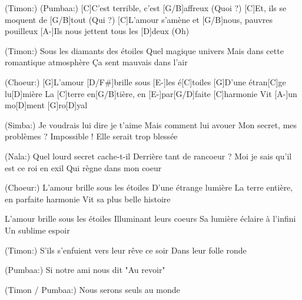
\begin{guitar}
	 (Timon:) (Pumbaa:)
[C]C'est terrible, c'est [G/B]affreux (Quoi ?)
[C]Et, ils se moquent de [G/B]tout (Qui ?)
[C]L'amour s'amène et [G/B]nous, pauvres pouilleux
[A-]Ils nous jettent tous les [D]deux (Oh)


(Timon:)
Sous les diamants des étoiles
Quel magique univers
Mais dans cette romantique atmosphère
Ça sent mauvais dans l'air

(Choeur:)
[G]L'amour [D/F#]brille sous [E-]les é[C]toiles
[G]D'une étran[C]ge lu[D]mière
La [C]terre en[G/B]tière, en [E-]par[G/D]faite [C]harmonie
Vit [A-]un mo[D]ment [G]ro[D]yal

(Simba:)
Je voudrais lui dire je t'aime
Mais comment lui avouer
Mon secret, mes problèmes ? Impossible !
Elle serait trop blessée


(Nala:)
Quel lourd secret cache-t-il
Derrière tant de rancoeur ?
Moi je sais qu'il est ce roi en exil
Qui règne dans mon coeur

(Choeur:)
L'amour brille sous les étoiles
D'une étrange lumière
La terre entière, en parfaite harmonie
Vit sa plus belle histoire

L'amour brille sous les étoiles
Illuminant leurs coeurs
Sa lumière éclaire à l'infini
Un sublime espoir


(Timon:)
S'ils s'enfuient vers leur rêve ce soir
Dans leur folle ronde

(Pumbaa:)
Si notre ami nous dit "Au revoir"

(Timon / Pumbaa:)
Nous serons seuls au monde 
\end{guitar}